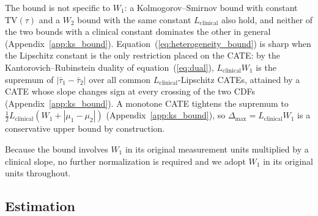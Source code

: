 \documentclass[AMA,Times1COL]{WileyNJDv5}
\begin{document}
The bound is not specific to $W_1$: a Kolmogorov--Smirnov bound with constant $\mathrm{TV}(\tau)$ and a $W_2$ bound with the same constant $L_{\text{clinical}}$ also hold, and neither of the two bounds with a clinical constant dominates the other in general (Appendix~\ref{app:ks_bound}).\cite{villani2009} Equation~(\ref{eq:heterogeneity_bound}) is sharp when the Lipschitz constant is the only restriction placed on the CATE: by the Kantorovich--Rubinstein duality of equation~(\ref{eq:dual}), $L_{\text{clinical}} W_1$ is the supremum of $|\bar{\tau}_1 - \bar{\tau}_2|$ over all common $L_{\text{clinical}}$-Lipschitz CATEs, attained by a CATE whose slope changes sign at every crossing of the two CDFs (Appendix~\ref{app:ks_bound}). A monotone CATE tightens the supremum to $\tfrac{1}{2} L_{\text{clinical}} (W_1 + |\mu_1 - \mu_2|)$ (Appendix~\ref{app:ks_bound}), so $\Delta_{\max} = L_{\text{clinical}} W_1$ is a conservative upper bound by construction.

Because the bound involves $W_1$ in its original measurement units multiplied by a clinical slope, no further normalization is required and we adopt $W_1$ in its original units throughout.

\subsection{Estimation}\label{sec:estimation}
\end{document}
